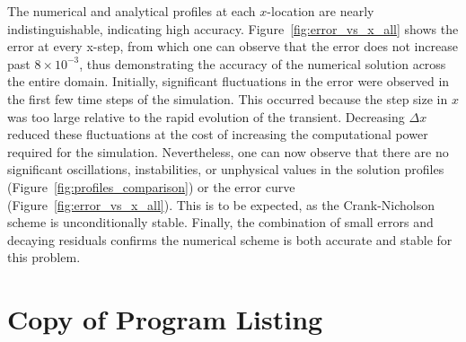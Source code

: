 \documentclass[letterpaper,12pt]{article}
\begin{document}
The numerical and analytical profiles at each $x$-location are nearly indistinguishable, indicating high accuracy. Figure~\ref{fig:error_vs_x_all} shows the error at every x-step, from which one can observe that the error does not increase past $8 \times 10^{-3}$, thus demonstrating the accuracy of the numerical solution across the entire domain. Initially, significant fluctuations in the error were observed in the first few time steps of the simulation. This occurred because the step size in $x$ was too large relative to the rapid evolution of the transient. Decreasing $\Delta x$ reduced these fluctuations at the cost of increasing the computational power required for the simulation. Nevertheless, one can now observe that there are no significant oscillations, instabilities, or unphysical values in the solution profiles (Figure~\ref{fig:profiles_comparison}) or the error curve (Figure~\ref{fig:error_vs_x_all}). This is to be expected, as the Crank-Nicholson scheme is unconditionally stable. Finally, the combination of small errors and decaying residuals confirms the numerical scheme is both accurate and stable for this problem.


\newpage
\appendix
\section{Copy of Program Listing}
\label{appendix-code}



\end{document}

